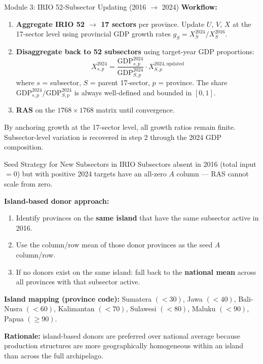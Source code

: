 \documentclass[aspectratio=169]{beamer}
\begin{document}
\begin{frame}{Module 3: IRIO 52-Subsector Updating (2016 $\to$ 2024)}
\textbf{Workflow:}
\begin{enumerate}
  \item \textbf{Aggregate IRIO 52 $\to$ 17 sectors} per province. Update $U$, $V$, $X$ at the 17-sector level using provincial GDP growth rates $g_S = X_S^{2024}/X_S^{2016}$.
  \item \textbf{Disaggregate back to 52 subsectors} using target-year GDP proportions:
  \[
  X_{s,p}^{2024} = \frac{\text{GDP}_{s,p}^{2024}}{\text{GDP}_{S,p}^{2024}} \cdot X_{S,p}^{2024,\text{updated}}
  \]
  where $s$ = subsector, $S$ = parent 17-sector, $p$ = province. The share $\text{GDP}_{s,p}^{2024}/\text{GDP}_{S,p}^{2024}$ is always well-defined and bounded in $[0,1]$.
  \item \textbf{RAS} on the $1768 \times 1768$ matrix until convergence.
\end{enumerate}

\medskip
By anchoring growth at the 17-sector level, all growth ratios remain finite. Subsector-level variation is recovered in step 2 through the 2024 GDP composition.
\end{frame}

\begin{frame}{Seed Strategy for New Subsectors in IRIO}
Subsectors absent in 2016 (total input $= 0$) but with positive 2024 targets have an all-zero $A$ column --- RAS cannot scale from zero.

\medskip
\textbf{Island-based donor approach:}
\begin{enumerate}
  \item Identify provinces on the \textbf{same island} that have the same subsector active in 2016.
  \item Use the column/row mean of those donor provinces as the seed $A$ column/row.
  \item If no donors exist on the same island: fall back to the \textbf{national mean} across all provinces with that subsector active.
\end{enumerate}

\medskip
\textbf{Island mapping (province code):} Sumatera $(<30)$, Jawa $(<40)$, Bali-Nusra $(<60)$, Kalimantan $(<70)$, Sulawesi $(<80)$, Maluku $(<90)$, Papua $(\geq 90)$.

\medskip
\textbf{Rationale:} island-based donors are preferred over national average because production structures are more geographically homogeneous within an island than across the full archipelago.
\end{frame}
\end{document}
